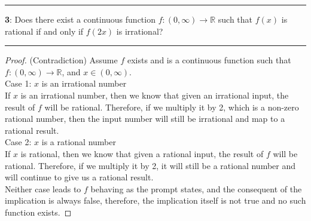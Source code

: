 \documentclass[11pt]{article}
\newcommand\question[2]{\vspace{.25in}\hrule\textbf{#1}: #2\vspace{.5em}\hrule\vspace{.10in}}
\newcommand{\R}{\mathbb{R}}
\begin{document}
\question{3}{Does there exist a continuous function $f: (0, \infty) \rightarrow \R$ such that $f(x)$ is rational if and only if $f(2x)$ is irrational?}

\begin{proof}
	(Contradiction) Assume $f$ exists and is a continuous function such that $f: (0, \infty) \rightarrow \R$, and $x \in (0, \infty)$.\\
	Case 1: $x$ is an irrational number\\
	If $x$ is an irrational number, then we know that given an irrational input, the result of $f$ will be rational. Therefore, if we multiply it by 2, which is a non-zero rational number, then the input number will still be irrational and map to a rational result.\\
	Case 2: $x$ is a rational number\\
	If $x$ is rational, then we know that given a rational input, the result of $f$ will be rational. Therefore, if we multiply it by 2, it will still be a rational number and will continue to give us a rational result.\\
	Neither case leads to $f$ behaving as the prompt states, and the consequent of the implication is always false, therefore, the implication itself is not true and no such function exists.
\end{proof}
	
\end{document}
